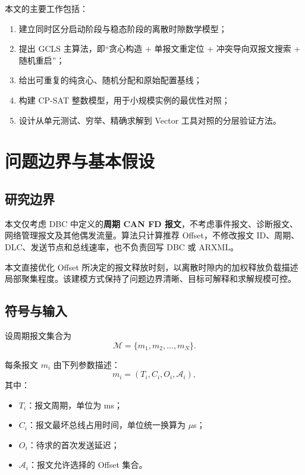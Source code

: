 \documentclass[UTF8,12pt,a4paper]{ctexart}
\newcommand{\Oset}{\mathcal{A}}
\newcommand{\Mset}{\mathcal{M}}
\begin{document}
本文的主要工作包括：

\begin{enumerate}
  \item 建立同时区分启动阶段与稳态阶段的离散时隙数学模型；
  \item 提出 GCLS 主算法，即“贪心构造 + 单报文重定位 + 冲突导向双报文搜索 + 随机重启”；
  \item 给出可重复的纯贪心、随机分配和原始配置基线；
  \item 构建 CP-SAT 整数模型，用于小规模实例的最优性对照；
  \item 设计从单元测试、穷举、精确求解到 Vector 工具对照的分层验证方法。
\end{enumerate}

\section{问题边界与基本假设}

\subsection{研究边界}

本文仅考虑 DBC 中定义的\textbf{周期 CAN FD 报文}，不考虑事件报文、诊断报文、网络管理报文及其他偶发流量。算法只计算推荐 Offset，不修改报文 ID、周期、DLC、发送节点和总线速率，也不负责回写 DBC 或 ARXML。

本文直接优化 Offset 所决定的报文释放时刻，以离散时隙内的加权释放负载描述局部聚集程度。该建模方式保持了问题边界清晰、目标可解释和求解规模可控。

\subsection{符号与输入}

设周期报文集合为
\begin{equation}
\Mset=\{m_1,m_2,\ldots,m_N\}.
\end{equation}

每条报文 $m_i$ 由下列参数描述：
\begin{equation}
 m_i=(T_i,C_i,O_i,\Oset_i),
\end{equation}
其中：

\begin{itemize}
  \item $T_i$：报文周期，单位为 ms；
  \item $C_i$：报文最坏总线占用时间，单位统一换算为 $\mu$s；
  \item $O_i$：待求的首次发送延迟；
  \item $\Oset_i$：报文允许选择的 Offset 集合。
\end{itemize}
\end{document}

